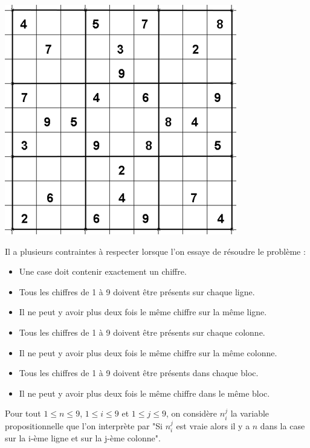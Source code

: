 \documentclass[12pt]{extarticle}
\begin{document}
\begin{center}
\includegraphics[scale=0.7]{sudoku.png}
\end{center}

Il a plusieurs contraintes à respecter lorsque l'on essaye de résoudre le problème :
\begin{itemize}
    \item Une case doit contenir exactement un chiffre.
    
    \item Tous les chiffres de 1 à 9 doivent être présents sur chaque ligne.
    \item Il ne peut y avoir plus deux fois le même chiffre sur la même ligne.

    \item Tous les chiffres de 1 à 9 doivent être présents sur chaque colonne.
    \item Il ne peut y avoir plus deux fois le même chiffre sur la même colonne.

    \item Tous les chiffres de 1 à 9 doivent être présents dans chaque bloc.
    \item Il ne peut y avoir plus deux fois le même chiffre dans le même bloc.
\end{itemize}

Pour tout $1 \leq n \leq 9$, $1 \leq i \leq 9$ et $1 \leq j \leq 9$, on considère $n_i^j$ la variable propositionnelle que l'on interprète par "Si $n_i^j$ est vraie alors il y a $n$ dans la case sur la i-ème ligne et sur la j-ème colonne". \\
\end{document}
